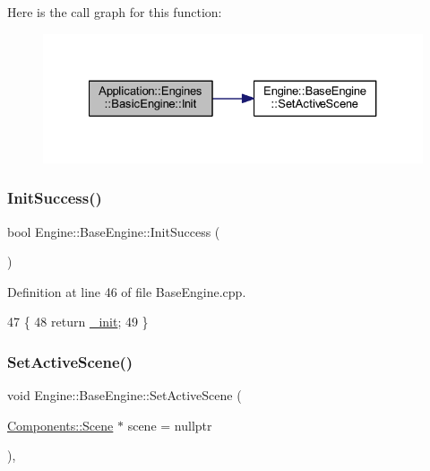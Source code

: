Here is the call graph for this function\+:
\nopagebreak
\begin{figure}[H]
\begin{center}
\leavevmode
\includegraphics[width=327pt]{classApplication_1_1Engines_1_1BasicEngine_afbdc9f559d1776371f90da00b61ba6ab_cgraph}
\end{center}
\end{figure}
\mbox{\label{classEngine_1_1BaseEngine_a7a1c9b833049b3eb61194cab113dfe89}} 
\subsubsection{\texorpdfstring{Init\+Success()}{InitSuccess()}}
{\footnotesize\ttfamily bool Engine\+::\+Base\+Engine\+::\+Init\+Success (\begin{DoxyParamCaption}{ }\end{DoxyParamCaption})\hspace{0.3cm}{\ttfamily [inherited]}}



Definition at line 46 of file Base\+Engine.\+cpp.


\begin{DoxyCode}
47 \{
48     \textcolor{keywordflow}{return} \mbox{\hyperlink{classEngine_1_1BaseEngine_a79e265845b321c0e9822fb170c564e55}{\_init}};
49 \}
\end{DoxyCode}
\mbox{\label{classEngine_1_1BaseEngine_afc82c6a00d5a9d4714740fc5eab5db86}} 
\subsubsection{\texorpdfstring{Set\+Active\+Scene()}{SetActiveScene()}}
{\footnotesize\ttfamily void Engine\+::\+Base\+Engine\+::\+Set\+Active\+Scene (\begin{DoxyParamCaption}\item[{\mbox{\hyperlink{classEngine_1_1Components_1_1Scene}{Components\+::\+Scene}} $\ast$}]{scene = {\ttfamily nullptr} }\end{DoxyParamCaption})\hspace{0.3cm}{\ttfamily [virtual]}, {\ttfamily [inherited]}}



